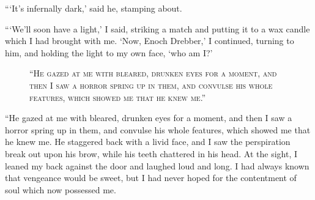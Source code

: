 \documentclass[12pt,english]{book}
\newcommand{\noun}[1]{\textsc{#1}}
\begin{document}
{}```It's infernally dark,' said he, stamping about.

{}```We'll soon have a light,' I said, striking a match and putting
it to a wax candle which I had brought with me. `Now, Enoch Drebber,'
I continued, turning to him, and holding the light to my own face,
`who am I?'

%
\begin{figure}[htbp]
\noindent {}

\noindent \begin{center}\noun{{}``He gazed at me with bleared,
drunken eyes for a moment, and then I saw a horror spring up in them,
and convulse his whole features, which showed me that he knew me.''}\end{center}
\end{figure}
{}``He gazed at me with bleared, drunken eyes for a moment, and then
I saw a horror spring up in them, and convulse his whole features,
which showed me that he knew me. He staggered back with a livid face,
and I saw the perspiration break out upon his brow, while his teeth
chattered in his head. At the sight, I leaned my back against the
door and laughed loud and long. I had always known that vengeance
would be sweet, but I had never hoped for the contentment of soul
which now possessed me.
\end{document}
